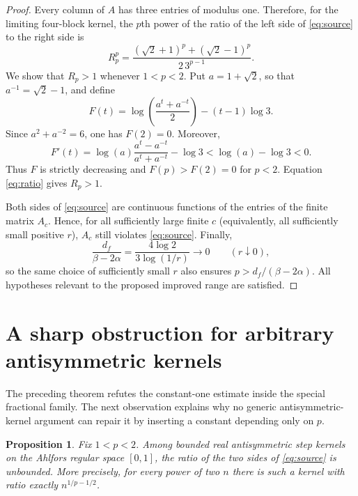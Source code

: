 \documentclass[11pt]{article}
\newtheorem{proposition}[theorem]{Proposition}
\begin{document}
\begin{proof}
Every column of $A$ has three entries of modulus one.  Therefore, for the
limiting four-block kernel, the $p$th power of the ratio of the left side of
\eqref{eq:source} to the right side is
\begin{equation}\label{eq:ratio}
 R_p^p=
 \frac{(\sqrt2+1)^p+(\sqrt2-1)^p}{2\,3^{p-1}}.
\end{equation}
We show that $R_p>1$ whenever $1<p<2$.  Put $a=1+\sqrt2$, so that
$a^{-1}=\sqrt2-1$, and define
\[
 F(t)=\log\!\left(\frac{a^t+a^{-t}}2\right)-(t-1)\log3.
\]
Since $a^2+a^{-2}=6$, one has $F(2)=0$.  Moreover,
\[
 F'(t)=\log(a)\frac{a^t-a^{-t}}{a^t+a^{-t}}-\log3
 <\log(a)-\log3<0.
\]
Thus $F$ is strictly decreasing and $F(p)>F(2)=0$ for $p<2$.  Equation
\eqref{eq:ratio} gives $R_p>1$.

Both sides of \eqref{eq:source} are continuous functions of the entries of
the finite matrix $A_c$.  Hence, for all sufficiently large finite $c$
(equivalently, all sufficiently small positive $r$), $A_c$ still violates
\eqref{eq:source}.  Finally,
\[
 \frac{d_f}{\beta-2\alpha}
 =\frac{4\log2}{3\log(1/r)}\longrightarrow0
 \qquad(r\downarrow0),
\]
so the same choice of sufficiently small $r$ also ensures
$p>d_f/(\beta-2\alpha)$.  All hypotheses relevant to the proposed improved
range are satisfied.
\end{proof}

\section{A sharp obstruction for arbitrary antisymmetric kernels}

The preceding theorem refutes the constant-one estimate inside the special
fractional family.  The next observation explains why no generic
antisymmetric-kernel argument can repair it by inserting a constant depending
only on $p$.

\begin{proposition}\label{prop:unbounded}
Fix $1<p<2$.  Among bounded real antisymmetric step kernels on the Ahlfors
regular space $[0,1]$, the ratio of the two sides of \eqref{eq:source} is
unbounded.  More precisely, for every power of two $n$ there is such a kernel
with ratio exactly $n^{1/p-1/2}$.
\end{proposition}
\end{document}
